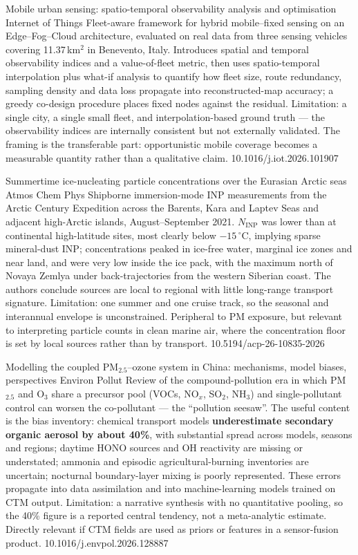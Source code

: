 \documentclass[10pt]{article}
\begin{document}
{Mobile urban sensing: spatio-temporal observability analysis and optimisation}
{Internet of Things}
{Fleet-aware framework for hybrid mobile--fixed sensing on an Edge--Fog--Cloud
architecture, evaluated on real data from three sensing vehicles covering 11.37\,km$^2$
in Benevento, Italy. Introduces spatial and temporal observability indices and a
value-of-fleet metric, then uses spatio-temporal interpolation plus what-if analysis to
quantify how fleet size, route redundancy, sampling density and data loss propagate into
reconstructed-map accuracy; a greedy co-design procedure places fixed nodes against the
residual. Limitation: a single city, a single small fleet, and interpolation-based ground
truth --- the observability indices are internally consistent but not externally
validated. The framing is the transferable part: opportunistic mobile coverage becomes a
measurable quantity rather than a qualitative claim.}
{10.1016/j.iot.2026.101907}

{Summertime ice-nucleating particle concentrations over the Eurasian Arctic seas}
{Atmos Chem Phys}
{Shipborne immersion-mode INP measurements from the Arctic Century Expedition across the
Barents, Kara and Laptev Seas and adjacent high-Arctic islands, August--September 2021.
$N_{\mathrm{INP}}$ was lower than at continental high-latitude sites, most clearly below
$-15\,^\circ$C, implying sparse mineral-dust INP; concentrations peaked in ice-free
water, marginal ice zones and near land, and were very low inside the ice pack, with the
maximum north of Novaya Zemlya under back-trajectories from the western Siberian coast.
The authors conclude sources are local to regional with little long-range transport
signature. Limitation: one summer and one cruise track, so the seasonal and interannual
envelope is unconstrained. Peripheral to PM exposure, but relevant to interpreting
particle counts in clean marine air, where the concentration floor is set by local
sources rather than by transport.}
{10.5194/acp-26-10835-2026}


{Modelling the coupled PM$_{2.5}$--ozone system in China: mechanisms, model biases,
perspectives}
{Environ Pollut}
{Review of the compound-pollution era in which PM$_{2.5}$ and O$_3$ share a precursor
pool (VOCs, NO$_x$, SO$_2$, NH$_3$) and single-pollutant control can worsen the
co-pollutant --- the ``pollution seesaw''. The useful content is the bias inventory:
chemical transport models \textbf{underestimate secondary organic aerosol by about 40\%},
with substantial spread across models, seasons and regions; daytime HONO sources and OH
reactivity are missing or understated; ammonia and episodic agricultural-burning
inventories are uncertain; nocturnal boundary-layer mixing is poorly represented. These
errors propagate into data assimilation and into machine-learning models trained on CTM
output. Limitation: a narrative synthesis with no quantitative pooling, so the 40\% figure
is a reported central tendency, not a meta-analytic estimate. Directly relevant if CTM
fields are used as priors or features in a sensor-fusion product.}
{10.1016/j.envpol.2026.128887}
\end{document}
